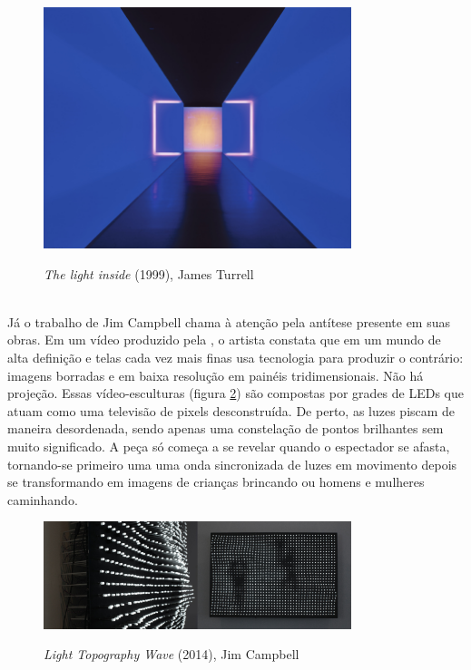 \begin{figure}[H]
    \centering
    \caption{\textit{The light inside} (1999), James Turrell}
	\vspace*{0,2cm}
    \includegraphics[width=0.8\textwidth]{./04-figuras/james_turrell}
    \label{fig:james_turrell}
\end{figure}
\vspace*{-0,9cm}
{\raggedright {}}\\

Já o trabalho de Jim Campbell chama à atenção pela antítese presente em suas obras. Em um vídeo produzido pela , o artista constata que em um mundo de alta definição e telas cada vez mais finas usa tecnologia para produzir o contrário: imagens borradas e em baixa resolução em painéis tridimensionais. Não há projeção. Essas vídeo-esculturas (figura \ref{fig:jim_campbell}) são compostas por grades de LEDs que atuam como uma televisão de pixels desconstruída. De perto, as luzes piscam de maneira desordenada, sendo apenas uma constelação de pontos brilhantes sem muito significado. A peça só começa a se revelar quando o espectador se afasta, tornando-se primeiro uma uma onda sincronizada de luzes em movimento depois se transformando em imagens de crianças brincando ou homens e mulheres caminhando. 

\begin{figure}[H]
    \centering
    \caption{\textit{Light Topography Wave} (2014), Jim Campbell}
	\vspace*{0,2cm}
    \includegraphics[width=0.8\textwidth]{./04-figuras/jim_campbell}
    \label{fig:jim_campbell}
\end{figure}
\vspace*{-0,9cm}
{\raggedright {}}\\



